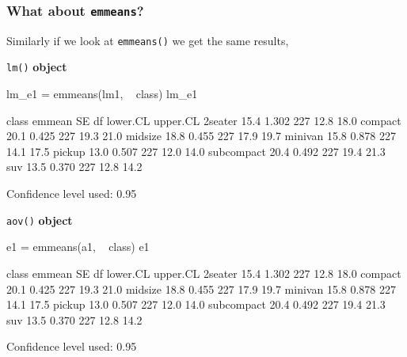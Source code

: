 \documentclass[a4paper]{article}
\begin{document}
\subsubsection{What about \lstinline|emmeans|?}
Similarly if we look at \lstinline|emmeans()| we get the same results,\\
\begin{minipage}[t]{0.49\textwidth}
\lstinline|lm()| \textbf{object}
\begin{Schunk}
\begin{Sinput}
lm_e1 = emmeans(lm1, ~ class)
lm_e1
\end{Sinput}
\begin{Soutput}
 class      emmean    SE  df lower.CL upper.CL
 2seater      15.4 1.302 227     12.8     18.0
 compact      20.1 0.425 227     19.3     21.0
 midsize      18.8 0.455 227     17.9     19.7
 minivan      15.8 0.878 227     14.1     17.5
 pickup       13.0 0.507 227     12.0     14.0
 subcompact   20.4 0.492 227     19.4     21.3
 suv          13.5 0.370 227     12.8     14.2

Confidence level used: 0.95 
\end{Soutput}
\end{Schunk}
\end{minipage}
\hspace{0.02\textwidth}
\begin{minipage}[t]{0.49\textwidth}
\lstinline|aov()| \textbf{object}
\begin{Schunk}
\begin{Sinput}
e1 = emmeans(a1, ~ class)
e1
\end{Sinput}
\begin{Soutput}
 class      emmean    SE  df lower.CL upper.CL
 2seater      15.4 1.302 227     12.8     18.0
 compact      20.1 0.425 227     19.3     21.0
 midsize      18.8 0.455 227     17.9     19.7
 minivan      15.8 0.878 227     14.1     17.5
 pickup       13.0 0.507 227     12.0     14.0
 subcompact   20.4 0.492 227     19.4     21.3
 suv          13.5 0.370 227     12.8     14.2

Confidence level used: 0.95 
\end{Soutput}
\end{Schunk}
\end{minipage}
\end{document}
